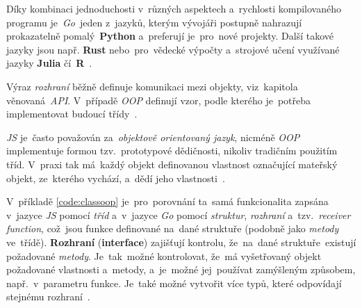 \documentclass[11pt,a4paper]{report}
\let\oldacrshort\acrshort
\renewcommand{\acrshort}[1]{\emph{\normalsize\color[rgb]{0,0,0}\noindent\oldacrshort{#1}}}
\begin{document}
            Díky kombinaci jednoduchosti v~různých aspektech a~rychlosti kompilovaného programu je~\emph{Go}~jeden z~jazyků, kterým vývojáři postupně nahrazují prokazatelně pomalý~\textbf{Python} a~preferují je~pro~nové projekty. Další takové jazyky jsou např. \textbf{Rust} nebo~pro~vědecké výpočty a~strojové učení využívané jazyky \textbf{Julia} čí~\textbf{R}~\cite{plainenglish:pythonfade2024}.

            Výraz \emph{rozhraní} běžně definuje komunikaci mezi objekty, viz~kapitola věnovaná~\acrshort{API}. V~případě \emph{OOP} definují vzor, podle kterého je~potřeba implementovat budoucí třídy~\cite{go:OOP}.
            
            \acrshort{JS} je~často považován za~\emph{objektově orientovaný jazyk}, nicméně \emph{OOP} implementuje formou tzv.~prototypové dědičnosti, nikoliv tradičním použitím tříd. V~praxi tak má~každý objekt definovanou vlastnost označující mateřský objekt, ze~kterého vychází, a~dědí jeho vlastnosti~\cite[2.1.01]{kantor_javascript, Scott2019:programmingpragmatics}.
            
            V~příkladě \ref{code:classoop} je~pro~porovnání ta~samá funkcionalita zapsána v~jazyce \acrshort{JS} pomocí \emph{tříd} a~v~jazyce \emph{Go} pomocí \emph{struktur}, \emph{rozhraní} a~tzv.~\emph{receiver function}, což~jsou funkce definované na~dané struktuře (podobně jako \emph{metody} ve~třídě). \textbf{Rozhraní} (\textbf{interface}) zajišťují kontrolu, že~na~dané struktuře~existují požadované \emph{metody}. Je~tak~možné kontrolovat, že~má vyšetřovaný objekt požadované vlastnosti a~metody, a~je~možné jej~používat zamýšleným způsobem, např.~v~parametru funkce. Je~také možné vytvořit více typů, které odpovídají stejnému rozhraní~\cite{go:OOP}.
\end{document}

